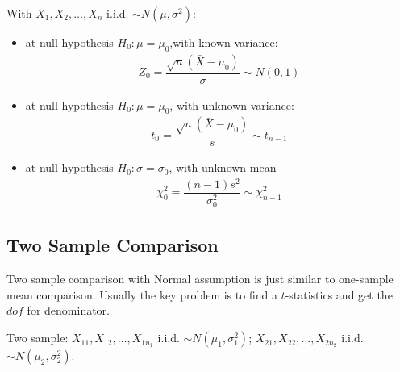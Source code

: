 With $ X_1,X_2,\ldots,X_n $ i.i.d. $ \sim N(\mu ,\sigma ^2) $:
\begin{itemize}[topsep=2pt,itemsep=0pt]
    \item at null hypothesis $ H_0: \mu =\mu _0 $,with known variance:
    \begin{align}
        Z_0 = \dfrac{ \sqrt{n}(\bar{X}-\mu _0) }{ \sigma  }\sim N(0,1)  
    \end{align}
    \item at null hypothesis $ H_0: \mu =\mu _0 $, with unknown variance:
    \begin{align}
        t_0 =  \dfrac{ \sqrt{n}(\bar{X}-\mu _0) }{ s  }\sim t_{n-1}
    \end{align}
    \item at null hypothesis $ H_0: \sigma =\sigma _0 $, with unknown mean
    \begin{align}
        \chi_0^2 = \dfrac{ (n-1)s^2 }{ \sigma _0^2 }  \sim \chi^2_{n-1}
    \end{align}   
\end{itemize}


\subsection{Two Sample Comparison}\label{SubSubSectionDoETwoSampleComparison}

Two sample comparison with Normal assumption is just similar to one-sample mean comparison. Usually the key problem is to find a $ t $-statistics and get the $ dof $ for denominator.

Two sample: $ X_{11},X_{12},\ldots,X_{1n_1} $ i.i.d. $ \sim N(\mu _1,\sigma _1^2) $; $ X_{21},X_{22},\ldots,X_{2n_2} $ i.i.d. $ \sim N(\mu _2,\sigma_2^2) $. 

